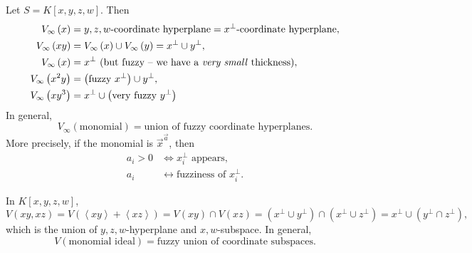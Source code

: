 \documentclass[co439]{subfiles}
\begin{document}
    \begin{example}{}
        Let $S = K\left[ x,y,z,w \right]$. Then
        \begin{equation*}
            \begin{aligned}
                V_{\infty}\left( x \right) & = \text{$y,z,w$-coordinate hyperplane} = \text{$x^{\perp}$-coordinate hyperplane}, \\
                V_{\infty}\left( xy \right) & = V_{\infty}\left( x \right)\cup V_{\infty}\left( y \right) = x^{\perp}\cup y^{\perp}, \\
                V_{\infty}\left( x \right) & = x^{\perp}\text{ (but fuzzy -- we have a \textit{very small} thickness)}, \\
                V_{\infty}\left( x^{2}y \right) & = \left( \text{fuzzy }x^{\perp} \right)\cup y^{\perp}, \\
                V_{\infty}\left( xy^{3} \right) & = x^{\perp}\cup\left( \text{very fuzzy }y^{\perp} \right)
            \end{aligned} 
        \end{equation*}
        In general,
        \begin{equation*}
            V_{\infty}\left( \text{monomial} \right) = \text{union of fuzzy coordinate hyperplanes}.
        \end{equation*}
        More precisely, if the monomial is $\vec{x}^{\vec{a}}$, then
        \begin{equation*}
            \begin{aligned}
                \text{$a_i>0$}&\iff\text{$x_i^{\perp}$ appears}, \\
                a_i&\longleftrightarrow\text{fuzziness of $x_i^{\perp}$}.
            \end{aligned} 
        \end{equation*}
    \end{example}

    \rruleline
    
    \begin{example}{}
        In $K\left[ x,y,z,w \right]$,
        \begin{equation*}
            V\left( xy,xz \right) = V\left( \left< xy \right>+\left< xz \right>   \right) = V\left( xy \right)\cap V\left( xz \right) = \left( x^{\perp}\cup y^{\perp} \right)\cap \left( x^{\perp}\cup z^{\perp} \right) = x^{\perp}\cup\left( y^{\perp}\cap z^{\perp} \right) ,
        \end{equation*}
        which is the union of $y,z,w$-hyperplane and $x,w$-subspace. In general,
        \begin{equation*}
            V\left( \text{monomial ideal} \right) = \text{fuzzy union of coordinate subspaces}.
        \end{equation*}
    \end{example}
\end{document}
